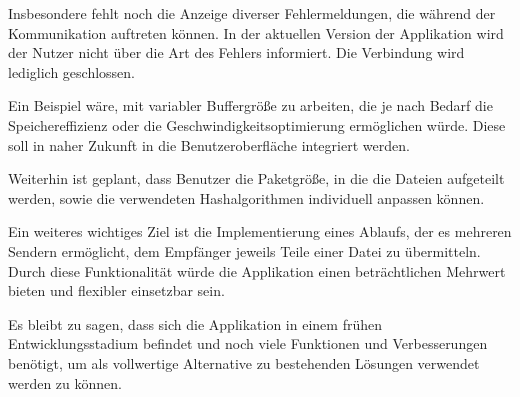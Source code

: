Insbesondere fehlt noch die Anzeige diverser Fehlermeldungen, die während der Kommunikation auftreten können. In der aktuellen Version der Applikation wird der Nutzer nicht über die Art des Fehlers informiert. Die Verbindung wird lediglich geschlossen.

Ein Beispiel wäre, mit variabler Buffergröße zu arbeiten, die je nach Bedarf die Speichereffizienz oder die Geschwindigkeitsoptimierung ermöglichen würde. Diese soll in naher Zukunft in die Benutzeroberfläche integriert werden.

Weiterhin ist geplant, dass Benutzer die Paketgröße, in die die Dateien aufgeteilt werden, sowie die verwendeten Hashalgorithmen individuell anpassen können.

Ein weiteres wichtiges Ziel ist die Implementierung eines Ablaufs, der es mehreren Sendern ermöglicht, dem Empfänger jeweils Teile einer Datei zu übermitteln. Durch diese Funktionalität würde die Applikation einen beträchtlichen Mehrwert bieten und flexibler einsetzbar sein.

Es bleibt zu sagen, dass sich die Applikation in einem frühen Entwicklungsstadium befindet und noch viele Funktionen und Verbesserungen benötigt, um als vollwertige Alternative zu bestehenden Lösungen verwendet werden zu können.